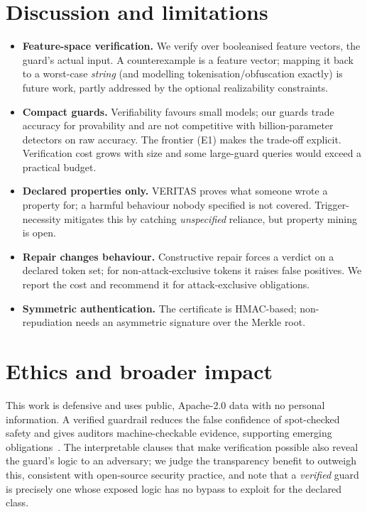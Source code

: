 \documentclass[11pt]{article}
\begin{document}
\section{Discussion and limitations}
\label{sec:limits}
\begin{itemize}[leftmargin=1.4em,itemsep=2pt]
\item \textbf{Feature-space verification.} We verify over booleanised feature
vectors, the guard's actual input. A counterexample is a feature vector; mapping it
back to a worst-case \emph{string} (and modelling tokenisation/obfuscation exactly)
is future work, partly addressed by the optional realizability constraints.
\item \textbf{Compact guards.} Verifiability favours small models; our guards trade
accuracy for provability and are not competitive with billion-parameter detectors
on raw accuracy. The frontier (E1) makes the trade-off explicit. Verification cost
grows with size and some large-guard queries would exceed a practical budget.
\item \textbf{Declared properties only.} VERITAS proves what someone wrote a
property for; a harmful behaviour nobody specified is not covered. Trigger-necessity
mitigates this by catching \emph{unspecified} reliance, but property mining is open.
\item \textbf{Repair changes behaviour.} Constructive repair forces a verdict on a
declared token set; for non-attack-exclusive tokens it raises false positives. We
report the cost and recommend it for attack-exclusive obligations.
\item \textbf{Symmetric authentication.} The certificate is HMAC-based;
non-repudiation needs an asymmetric signature over the Merkle root.
\end{itemize}

\section{Ethics and broader impact}
This work is defensive and uses public, Apache-2.0 data with no personal
information. A verified guardrail reduces the false confidence of spot-checked
safety and gives auditors machine-checkable evidence, supporting emerging
obligations~\citep{euaiact2024,dalrymple2024guaranteed}. The interpretable clauses
that make verification possible also reveal the guard's logic to an adversary; we
judge the transparency benefit to outweigh this, consistent with open-source
security practice, and note that a \emph{verified} guard is precisely one whose
exposed logic has no bypass to exploit for the declared class.
\end{document}
